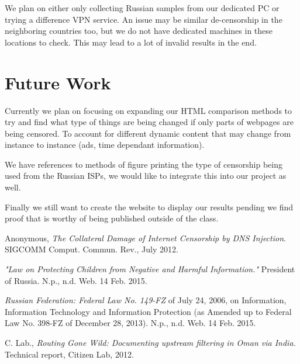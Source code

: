 \documentclass[conference]{IEEEtran}
\begin{document}
We plan on either only collecting Russian samples from our dedicated PC or trying a difference VPN service. 
An issue may be similar de-censorship in the neighboring countries too, but we do not have dedicated machines in these locations to check. 
This may lead to a lot of invalid results in the end. 

\section{Future Work}

Currently we plan on focusing on expanding our HTML comparison methods to try and find what type of things are being changed if only parts of webpages are being censored.
To account for different dynamic content that may change from instance to instance (ads, time dependant information).

We have references to methods of figure printing the type of censorship being used from the Russian ISPs, we would like to integrate this into our project as well. 

Finally we still want to create the website to display our results pending we find proof that is worthy of being published outside of the class. 


\begin{thebibliography}{9}


  Anonymous,
  \emph{The Collateral Damage of Internet Censorship by DNS Injection}.
  SIGCOMM Comput. Commun. Rev., July 2012.
  
    \emph{"Law on Protecting Children from Negative and Harmful Information."} President of Russia. N.p., n.d. Web. 14 Feb. 2015. 
    
    \emph{Russian Federation: Federal Law No. 149-FZ} of July 24, 2006, on Information, Information Technology and Information Protection (as Amended up to Federal Law No. 398-FZ of December 28, 2013). N.p., n.d. Web. 14 Feb. 2015.
    
C. Lab., 
    \emph{Routing Gone Wild: Documenting upstream filtering in Oman via India.} Technical report, Citizen Lab, 2012. 

\end{thebibliography}
\end{document}
